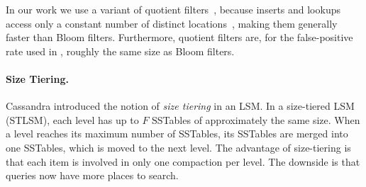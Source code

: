 
In our work we use a variant of quotient
filters~\cite{DBLP:conf/hotstorage/BenderFJKMMSSZ11}, because inserts
and lookups access only a constant number of distinct
locations~\cite{DBLP:conf/hotstorage/BenderFJKMMSSZ11}, making them
generally faster than Bloom filters.  Furthermore, quotient filters
are, for the false-positive rate used in \sysname, roughly the same
size as Bloom filters.





\paragraph{Size Tiering.} Cassandra introduced the notion of \emph{size
tiering} in an LSM.  In a size-tiered LSM (STLSM), each level has up
to $F$ SSTables of approximately the same size.  When a level
reaches its maximum number of SSTables, its SSTables are merged into
one SSTables, which is moved to the next level.
The advantage of size-tiering is that each item is involved in only
one compaction per level.  The downside is that queries now have
more places to search.

